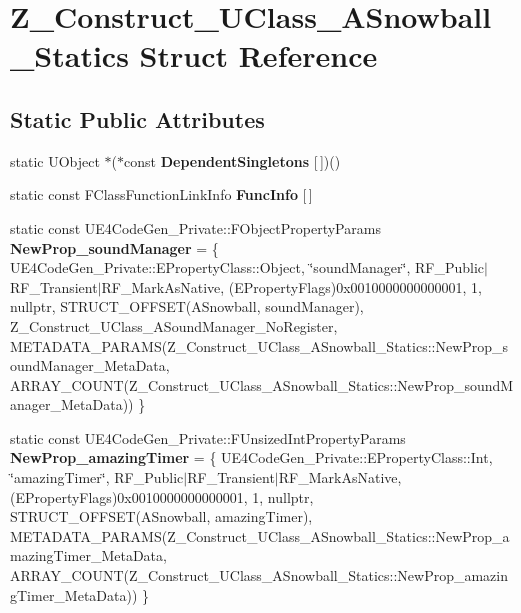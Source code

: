 \hypertarget{struct_z___construct___u_class___a_snowball___statics}{}\section{Z\+\_\+\+Construct\+\_\+\+U\+Class\+\_\+\+A\+Snowball\+\_\+\+Statics Struct Reference}
\label{struct_z___construct___u_class___a_snowball___statics}
\subsection*{Static Public Attributes}
\begin{DoxyCompactItemize}
\item 
\mbox{\label{struct_z___construct___u_class___a_snowball___statics_a297c168c7314905e0bae4f69838c4968}} 
static U\+Object $\ast$($\ast$const {\bfseries Dependent\+Singletons} \mbox{[}$\,$\mbox{]})()
\item 
static const F\+Class\+Function\+Link\+Info {\bfseries Func\+Info} \mbox{[}$\,$\mbox{]}
\item 
\mbox{\label{struct_z___construct___u_class___a_snowball___statics_af4658fb2c6e4ac3c4e97f5cf55a09bbb}} 
static const U\+E4\+Code\+Gen\+\_\+\+Private\+::\+F\+Object\+Property\+Params {\bfseries New\+Prop\+\_\+sound\+Manager} = \{ U\+E4\+Code\+Gen\+\_\+\+Private\+::\+E\+Property\+Class\+::\+Object, \char`\"{}sound\+Manager\char`\"{}, R\+F\+\_\+\+Public$\vert$R\+F\+\_\+\+Transient$\vert$R\+F\+\_\+\+Mark\+As\+Native, (E\+Property\+Flags)0x0010000000000001, 1, nullptr, S\+T\+R\+U\+C\+T\+\_\+\+O\+F\+F\+S\+E\+T(\+A\+Snowball, sound\+Manager), Z\+\_\+\+Construct\+\_\+\+U\+Class\+\_\+\+A\+Sound\+Manager\+\_\+\+No\+Register, M\+E\+T\+A\+D\+A\+T\+A\+\_\+\+P\+A\+R\+A\+M\+S(\+Z\+\_\+\+Construct\+\_\+\+U\+Class\+\_\+\+A\+Snowball\+\_\+\+Statics\+::\+New\+Prop\+\_\+sound\+Manager\+\_\+\+Meta\+Data, A\+R\+R\+A\+Y\+\_\+\+C\+O\+U\+N\+T(\+Z\+\_\+\+Construct\+\_\+\+U\+Class\+\_\+\+A\+Snowball\+\_\+\+Statics\+::\+New\+Prop\+\_\+sound\+Manager\+\_\+\+Meta\+Data)) \}
\item 
\mbox{\label{struct_z___construct___u_class___a_snowball___statics_a233a6fd40b6776c352cc2cf3d8e4b16f}} 
static const U\+E4\+Code\+Gen\+\_\+\+Private\+::\+F\+Unsized\+Int\+Property\+Params {\bfseries New\+Prop\+\_\+amazing\+Timer} = \{ U\+E4\+Code\+Gen\+\_\+\+Private\+::\+E\+Property\+Class\+::\+Int, \char`\"{}amazing\+Timer\char`\"{}, R\+F\+\_\+\+Public$\vert$R\+F\+\_\+\+Transient$\vert$R\+F\+\_\+\+Mark\+As\+Native, (E\+Property\+Flags)0x0010000000000001, 1, nullptr, S\+T\+R\+U\+C\+T\+\_\+\+O\+F\+F\+S\+E\+T(\+A\+Snowball, amazing\+Timer), M\+E\+T\+A\+D\+A\+T\+A\+\_\+\+P\+A\+R\+A\+M\+S(\+Z\+\_\+\+Construct\+\_\+\+U\+Class\+\_\+\+A\+Snowball\+\_\+\+Statics\+::\+New\+Prop\+\_\+amazing\+Timer\+\_\+\+Meta\+Data, A\+R\+R\+A\+Y\+\_\+\+C\+O\+U\+N\+T(\+Z\+\_\+\+Construct\+\_\+\+U\+Class\+\_\+\+A\+Snowball\+\_\+\+Statics\+::\+New\+Prop\+\_\+amazing\+Timer\+\_\+\+Meta\+Data)) \}

\end{DoxyCompactItemize}
